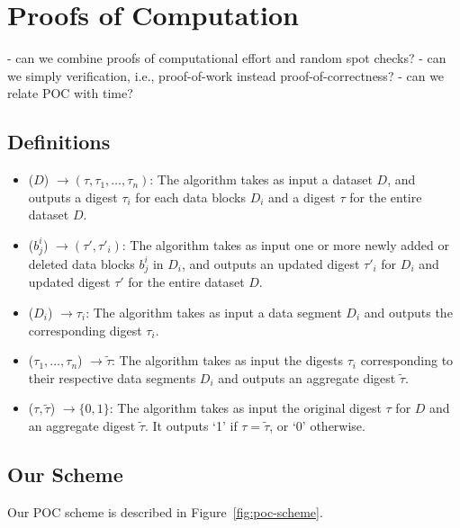 \section{Proofs of Computation} \label{sect:poc}

- can we combine proofs of computational effort and random spot checks?
- can we simply verification, i.e., proof-of-work instead proof-of-correctness?
- can we relate POC with time?

\subsection{Definitions} \label{sect:poc-definition}

\begin{itemize}
\item \Setup($D$) $\rightarrow (\tau,\tau_1,\dotsc,\tau_n)$: The algorithm takes as input a dataset $D$, and outputs a digest $\tau_i$ for each data blocks $D_i$ and a digest $\tau$ for the entire dataset $D$.

\item \Update($b^i_j$) $\rightarrow (\tau',\tau'_i)$: The algorithm takes as input one or more newly added or deleted data blocks $b^i_j$ in $D_i$, and outputs an updated digest $\tau'_i$ for $D_i$ and updated digest $\tau'$ for the entire dataset $D$.

\item \Prove($D_i$) $\rightarrow \tau_i$: The algorithm takes as input a data segment $D_i$ and outputs the corresponding digest $\tau_i$.

\item \Aggregate($\tau_1,\dotsc,\tau_n$) $\rightarrow \tilde{\tau}$: The algorithm takes as input the digests $\tau_i$ corresponding to their respective data segments $D_i$ and outputs an aggregate digest $\tilde{\tau}$.

\item \Verify($\tau, \tilde{\tau}$) $\rightarrow \{0,1\}$: The algorithm takes as input the original digest $\tau$ for $D$ and an aggregate digest $\tilde{\tau}$. It outputs `1' if $\tau=\tilde{\tau}$, or `0' otherwise.
\end{itemize}

\subsection{Our Scheme} \label{sect:poc-scheme}

Our POC scheme is described in Figure~\ref{fig:poc-scheme}.

